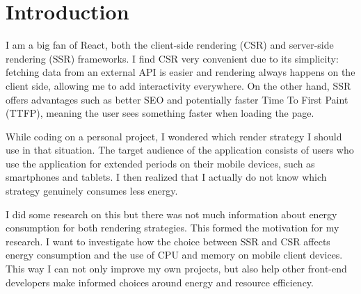 \section{Introduction}

I am a big fan of React, both the client-side rendering (CSR) and server-side rendering (SSR) frameworks. I find CSR very convenient due to its simplicity: fetching data from an external API is easier and rendering always happens on the client side, allowing me to add interactivity everywhere. On the other hand, SSR offers advantages such as better SEO and potentially faster Time To First Paint (TTFP), meaning the user sees something faster when loading the page.

While coding on a personal project, I wondered which render strategy I should use in that situation. The target audience of the application consists of users who use the application for extended periods on their mobile devices, such as smartphones and tablets. I then realized that I actually do not know which strategy genuinely consumes less energy.

I did some research on this but there was not much information about energy consumption for both rendering strategies. This formed the motivation for my research. I want to investigate how the choice between SSR and CSR affects energy consumption and the use of CPU and memory on mobile client devices. This way I can not only improve my own projects, but also help other front-end developers make informed choices around energy and resource efficiency.
